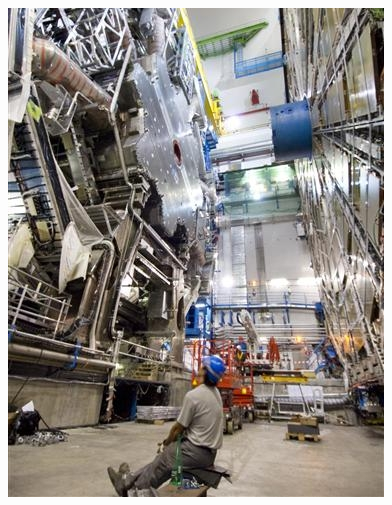 \documentclass{beamer}
\begin{document}
\begin{frame}
{\begin{columns}
\begin{column}{0.55\textwidth}
        \end{column}
        \begin{column}{0.4\textwidth}
            \centering
            \includegraphics[width=\textwidth]{figures/lhc3.jpg}
        \end{column}
    \end{columns}
    }
\end{frame}
\end{document}
